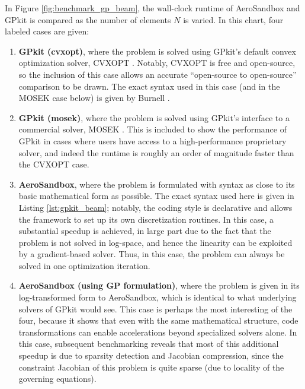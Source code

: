 In Figure \ref{fig:benchmark_gp_beam}, the wall-clock runtime of AeroSandbox and GPkit is compared as the number of elements $N$ is varied. In this chart, four labeled cases are given:
\begin{enumerate}
    \item \textbf{GPkit (cvxopt)}, where the problem is solved using GPkit's default convex optimization solver, CVXOPT \cite{cvxopt}. Notably, CVXOPT is free and open-source, so the inclusion of this case allows an accurate ``open-source to open-source'' comparison to be drawn. The exact syntax used in this case (and in the MOSEK case below) is given by Burnell \cite{gpkit_beam}.
    \item \textbf{GPkit (mosek)}, where the problem is solved using GPkit's interface to a commercial solver, MOSEK \cite{mosek}. This is included to show the performance of GPkit in cases where users have access to a high-performance proprietary solver, and indeed the runtime is roughly an order of magnitude faster than the CVXOPT case.
    \item \textbf{AeroSandbox}, where the problem is formulated with syntax as close to its basic mathematical form as possible. The exact syntax used here is given in Listing \ref{lst:gpkit_beam}; notably, the coding style is declarative and allows the framework to set up its own discretization routines. In this case, a substantial speedup is achieved, in large part due to the fact that the problem is not solved in log-space, and hence the linearity can be exploited by a gradient-based solver. Thus, in this case, the problem can always be solved in one optimization iteration.
    \item \textbf{AeroSandbox (using GP formulation)}, where the problem is given in its log-transformed form to AeroSandbox, which is identical to what underlying solvers of GPkit would see. This case is perhaps the most interesting of the four, because it shows that even with the same mathematical structure, code transformations can enable accelerations beyond specialized solvers alone. In this case, subsequent benchmarking reveals that most of this additional speedup is due to sparsity detection and Jacobian compression, since the constraint Jacobian of this problem is quite sparse (due to locality of the governing equations).
\end{enumerate}

